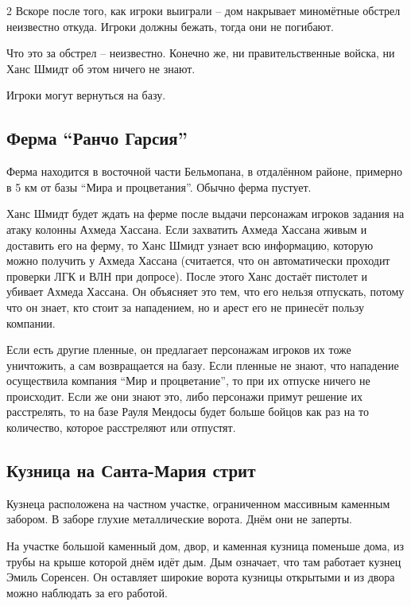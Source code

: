 \documentclass[twoside]{article}
\begin{document}
\begin{multicols}{2}
Вскоре после того, как игроки выиграли -- дом накрывает миномётные
обстрел неизвестно откуда. Игроки должны бежать, тогда они не погибают.

Что это за обстрел -- неизвестно. Конечно же, ни правительственные
войска, ни Ханс Шмидт об этом ничего не знают.

Игроки могут вернуться на базу.

\subsection{Ферма \enquote{Ранчо Гарсия}}\label{ranch-garcia}

Ферма находится в восточной части Бельмопана, в отдалённом районе,
примерно в 5 км от базы \enquote{Мира и процветания}. Обычно ферма пустует.

Ханс Шмидт будет ждать на ферме после выдачи персонажам игроков задания
на атаку колонны Ахмеда Хассана. Если захватить Ахмеда Хассана живым и
доставить его на ферму, то Ханс Шмидт узнает всю информацию, которую
можно получить у Ахмеда Хассана (считается, что он автоматически
проходит проверки ЛГК и ВЛН при допросе). После этого Ханс достаёт пистолет и
убивает Ахмеда Хассана. Он объясняет это тем, что его нельзя отпускать,
потому что он знает, кто стоит за нападением, но и арест его не принесёт
пользу компании.

Если есть другие пленные, он предлагает персонажам игроков их тоже
уничтожить, а сам возвращается на базу. Если пленные не знают, что
нападение осуществила компания \enquote{Мир и процветание}, то при их отпуске
ничего не происходит. Если же они знают это, либо персонажи примут
решение их расстрелять, то на базе Рауля Мендосы будет больше бойцов как
раз на то количество, которое расстреляют или отпустят.

\subsection{Кузница на Санта-Мария стрит}\label{kuznitsa-santa-maria}

Кузнеца расположена на частном участке, ограниченном массивным каменным
забором. В заборе глухие металлические ворота. Днём они не заперты.

На участке большой каменный дом, двор, и каменная кузница поменьше дома,
из трубы на крыше которой днём идёт дым. Дым означает, что там работает
кузнец Эмиль Соренсен. Он оставляет широкие ворота кузницы открытыми и
из двора можно наблюдать за его работой.


\end{multicols}
\end{document}
